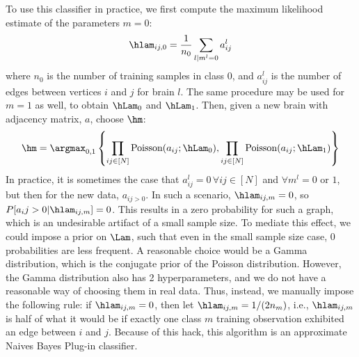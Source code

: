 To use this classifier in practice, we first compute the maximum likelihood estimate of the parameters $m=0$:
\begin{align}
	\hlam_{ij,0} = \frac{1}{n_0}\sum_{l | m^l = 0} a_{ij}^l
\end{align}
where $n_0$ is the number of training samples in class $0$, and $a_{ij}^l$ is the number of edges between vertices $i$ and $j$ for brain $l$.  The same procedure may be used for $m=1$ as well, to obtain $\hLam_0$ and $\hLam_1$.  Then, given a new brain with adjacency matrix, $a$, choose $\hm$:
\begin{align}
	\hm = \argmax_{0,1} \left\{\prod_{ij \in [N]} \text{Poisson}(a_{ij}; \hLam_0), \prod_{ij \in [N]} \text{Poisson}(a_{ij}; \hLam_1)\right\}
\end{align}
In practice, it is sometimes the case that $a_{ij}^l=0 \, \forall ij \in [N]$ and $\forall m^l = 0$ or $1$, but then for the new data, $a_{ij>0}$.  In such a scenario, $\hlam_{ij,m}=0$, so $P[a_ij > 0 | \hlam_{ij,m}]=0$.  This results in a zero probability for such a graph, which is an undesirable artifact of a small sample size.  To mediate this effect, we could impose a prior on $\Lam$, such that even in the small sample size case, $0$ probabilities are less frequent.  A reasonable choice would be a Gamma distribution, which is the conjugate prior of the Poisson distribution.  However, the Gamma distribution also has 2 hyperparameters, and we do not have a reasonable way of choosing them in real data.  Thus, instead, we manually impose the following rule: if $\hlam_{ij,m}=0$, then let $\hlam_{ij,m}=1/(2 n_m)$, i.e., $\hlam_{ij,m}$ is half of what it would be if exactly one class $m$ training observation exhibited an edge between $i$ and $j$. Because of this hack, this algorithm is an approximate Naives Bayes Plug-in classifier.
% 

